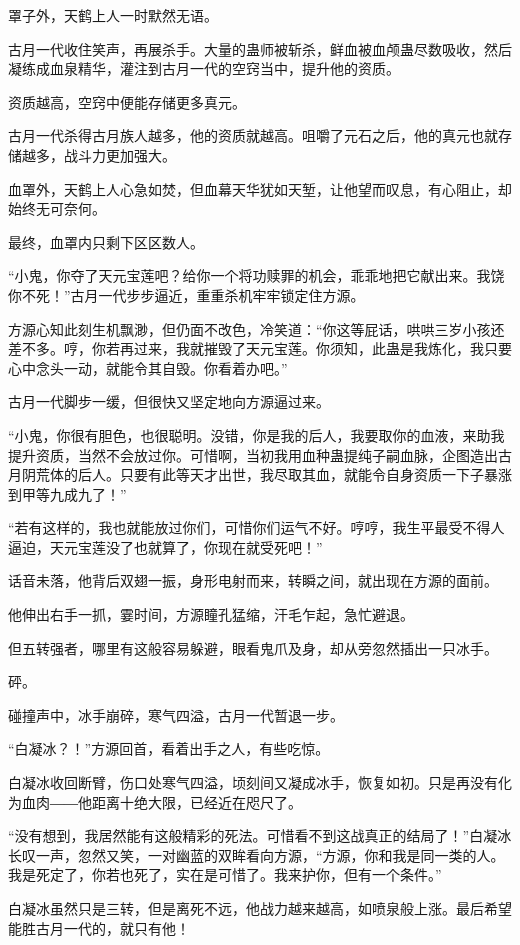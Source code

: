 \begin{this_body}
罩子外，天鹤上人一时默然无语。

古月一代收住笑声，再展杀手。大量的蛊师被斩杀，鲜血被血颅蛊尽数吸收，然后凝练成血泉精华，灌注到古月一代的空窍当中，提升他的资质。

资质越高，空窍中便能存储更多真元。

古月一代杀得古月族人越多，他的资质就越高。咀嚼了元石之后，他的真元也就存储越多，战斗力更加强大。

血罩外，天鹤上人心急如焚，但血幕天华犹如天堑，让他望而叹息，有心阻止，却始终无可奈何。

最终，血罩内只剩下区区数人。

“小鬼，你夺了天元宝莲吧？给你一个将功赎罪的机会，乖乖地把它献出来。我饶你不死！”古月一代步步逼近，重重杀机牢牢锁定住方源。

方源心知此刻生机飘渺，但仍面不改色，冷笑道：“你这等屁话，哄哄三岁小孩还差不多。哼，你若再过来，我就摧毁了天元宝莲。你须知，此蛊是我炼化，我只要心中念头一动，就能令其自毁。你看着办吧。”

古月一代脚步一缓，但很快又坚定地向方源逼过来。

“小鬼，你很有胆色，也很聪明。没错，你是我的后人，我要取你的血液，来助我提升资质，当然不会放过你。可惜啊，当初我用血种蛊提纯子嗣血脉，企图造出古月阴荒体的后人。只要有此等天才出世，我尽取其血，就能令自身资质一下子暴涨到甲等九成九了！”

“若有这样的，我也就能放过你们，可惜你们运气不好。哼哼，我生平最受不得人逼迫，天元宝莲没了也就算了，你现在就受死吧！”

话音未落，他背后双翅一振，身形电射而来，转瞬之间，就出现在方源的面前。

他伸出右手一抓，霎时间，方源瞳孔猛缩，汗毛乍起，急忙避退。

但五转强者，哪里有这般容易躲避，眼看鬼爪及身，却从旁忽然插出一只冰手。

砰。

碰撞声中，冰手崩碎，寒气四溢，古月一代暂退一步。

“白凝冰？！”方源回首，看着出手之人，有些吃惊。

白凝冰收回断臂，伤口处寒气四溢，顷刻间又凝成冰手，恢复如初。只是再没有化为血肉――他距离十绝大限，已经近在咫尺了。

“没有想到，我居然能有这般精彩的死法。可惜看不到这战真正的结局了！”白凝冰长叹一声，忽然又笑，一对幽蓝的双眸看向方源，“方源，你和我是同一类的人。我是死定了，你若也死了，实在是可惜了。我来护你，但有一个条件。”

白凝冰虽然只是三转，但是离死不远，他战力越来越高，如喷泉般上涨。最后希望能胜古月一代的，就只有他！


\end{this_body}
